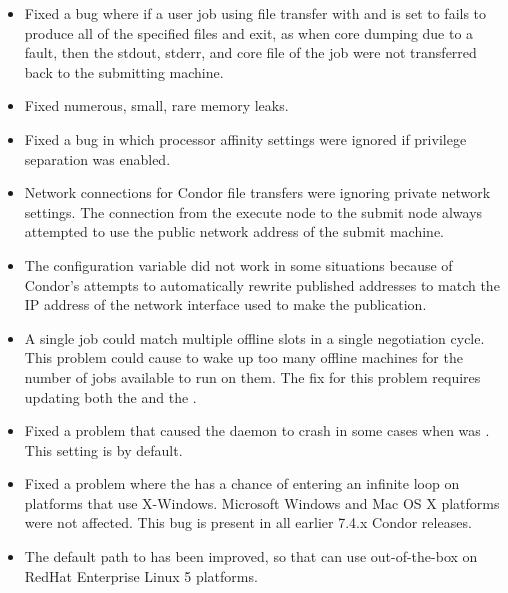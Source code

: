 \begin{itemize}
\item
  Fixed a bug where if a user job using file transfer with
   and 
  is set to  fails
  to produce all of the specified files and exit, as when core
  dumping due to a fault, then the stdout, stderr, and core file of the
  job were not transferred back to the submitting machine.

\item
  Fixed numerous, small, rare memory leaks.

\item 
  Fixed a bug in which processor affinity settings were ignored if
  privilege separation was enabled.

\item Network connections for Condor file transfers were ignoring
  private network settings.  The connection from the execute node to
  the submit node always attempted to use the public network address
  of the submit machine.

\item The configuration variable  did not work
in some situations
because of Condor's attempts to automatically rewrite published addresses to
match the IP address of the network interface used to make the publication.

\item A single job could match multiple offline slots in a single
negotiation cycle.  This problem could cause  to
wake up too many offline machines for the number of jobs available
to run on them.  The fix for this problem requires updating both
the  and the .

\item Fixed a problem that caused the  daemon to
crash in some cases when  was .
This setting is  by default.

\item Fixed a problem where the  has a chance of
entering an infinite loop on platforms that use X-Windows.
Microsoft Windows and Mac OS X platforms were not affected.  This bug is
present in all earlier 7.4.x Condor releases.

\item The default path to  has been improved,
 so that  can use  out-of-the-box on 
RedHat Enterprise Linux 5 platforms.


\end{itemize}
